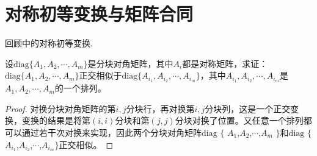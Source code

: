 \documentclass[../../main.tex]{subfiles}%
\begin{document}
\section{对称初等变换与矩阵合同}

回顾中的对称初等变换.

\begin{proposition}\label{proposition:分块对称准对角阵正交相似于其任意排列}
设\(\mathrm{diag}\{A_1,A_2,\cdots,A_m\}\)是分块对角矩阵，其中\(A_i\)都是对称矩阵，求证：\(\mathrm{diag}\{A_1,A_2,\cdots,A_m\}\)正交相似于\(\mathrm{diag}\{A_{i_1},A_{i_2},\cdots,A_{i_m}\}\)，其中\(A_{i_1},A_{i_2},\cdots,A_{i_m}\)是\(A_1,A_2,\cdots,A_m\)的一个排列。
\end{proposition}
\begin{proof}

对换分块对角矩阵的第\(i,j\)分块行，再对换第\(i,j\)分块列，这是一个正交变换，变换的结果是将第\((i,i)\)分块和第\((j,j)\)分块对换了位置。又任意一个排列都可以通过若干次对换来实现，因此两个分块对角矩阵$\mathrm{diag}$ $\{$ $A_1$,$A_2$,$\cdots$,$A_m$ $\}$和$\mathrm{diag}$ $\{$ $A_{i_1}$,$A_{i_2}$,$\cdots$,$A_{i_m}\}$正交相似。

\end{proof}
\end{document}
